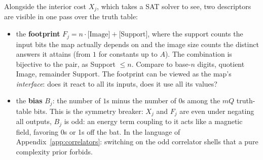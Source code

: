 \documentclass[11pt]{article}
\begin{document}
Alongside the interior cost $X_j$, which takes a SAT solver to see,
two descriptors are visible in one pass over the truth table:
%
\begin{itemize}
\item the \textbf{footprint} $F_j = n \cdot \text{[Image]} + \text{[Support]}$, where the support
 counts the input bits the map actually depends on and the
  image size counts the distinct answers it attains (from $1$
  for constants up to $A$). The combination is bijective to the pair, as Support $\le n$.
  Compare to base-$n$ digits, quotient Image, remainder Support. The footprint can be viewed as the
  map's \emph{interface}: does it react to all its inputs, does it
  use all its values?
\item the \textbf{bias} $B_j$: the number of $1$s minus the number of
  $0$s among the $mQ$ truth-table bits. This is the
  symmetry breaker: $X_j$ and $F_j$ are even under negating all
  outputs, $B_j$ is odd: an energy term coupling to it acts like a
  magnetic field, favoring 0s or 1s off the bat. In the language of Appendix~\ref{app:correlators}: 
  switching on the odd correlator shells that a pure
  complexity prior forbids.
\end{itemize}
\end{document}

